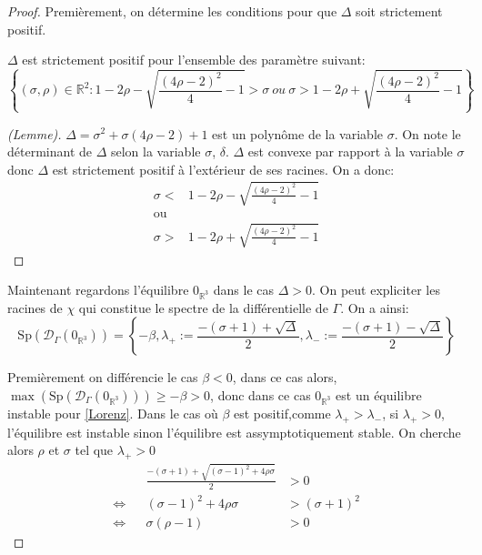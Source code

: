 \documentclass{article}
\newcommand{\R}{\mathbb{R}}
\newtheorem[M , nocut]{prop}{Proposition}[section]
\newtheorem[M , nocut]{definition}{Définition}
\newtheorem[M , nocut]{lemme}{Lemme}
\newtheorem[L , nocut]{thm}{Théoreme}
\newtheorem[M , nocut]{cor}{Corollaire}
\begin{document}
\begin{proof}
    Premièrement, on détermine les conditions pour que $\Delta$ soit strictement positif.
    \begin{lemme}
        $\Delta$ est strictement positif pour l'ensemble des paramètre suivant:
        \[
         \left\{(\sigma,\rho)\in \R ^2 : 1-2 \rho - \sqrt{\frac{(4\rho-2)^2}{4} -1 } > \sigma\ ou \ \sigma > 1-2 \rho + \sqrt{ \frac{(4\rho-2)^2}{4} -1  } \right\}    
        \]
    \end{lemme}
    
        \begin{proof}[(Lemme)]
            $\Delta = \sigma^2 + \sigma(4\rho-2) + 1$ est un polynôme de la variable $\sigma$. On note le déterminant de $\Delta$ selon la variable $\sigma$, $\delta$. $\Delta$ est convexe par rapport à la variable $\sigma$ donc $\Delta$ est strictement positif à l'extérieur de ses racines. On a donc:
            \begin{align*}
                \sigma <& 1-2 \rho - \sqrt{\frac{(4\rho-2)^2}{4} -1 }\\
                \text{ou}\\
                \sigma >& 1-2 \rho + \sqrt{\frac{(4\rho-2)^2}{4} -1 }
            \end{align*}
        \end{proof}
        
    Maintenant regardons l'équilibre $0_{\R^3}$ dans le cas $\Delta> 0$. On peut expliciter les racines de $\chi$ qui constitue le spectre de la différentielle de $\Gamma$. On a ainsi:
    \[
        \mathrm{Sp}(\mathcal{D}_\Gamma (0_{\R^3}))= \left\{-\beta,\lambda_+ := \frac{-(\sigma+1) + \sqrt{\Delta}}{2},\lambda_- := \frac{-(\sigma+1) - \sqrt{\Delta}}{2}\right\}  
    \]

    Premièrement on différencie le cas $\beta<0$, dans ce cas alors, $\max(\mathrm{Sp}(\mathcal{D}_\Gamma (0_{\R^3})))\ge -\beta > 0$, donc dans ce cas $0_{\R^3}$ est un équilibre instable pour \eqref{Lorenz}. Dans le cas où $\beta$ est positif,comme $\lambda_+>\lambda_-$, si $\lambda_+ > 0$, l'équilibre est instable sinon l'équilibre est assymptotiquement stable. On cherche alors $\rho$ et $\sigma$ tel que $\lambda_+>0$
    \begin{align*}
        && \frac{-(\sigma+1) + \sqrt{(\sigma-1)^2+4\rho\sigma}}{2} &>0 \\
        \Leftrightarrow && (\sigma-1)^2+4\rho\sigma &> (\sigma+1)^2 \\
        \Leftrightarrow && \sigma(\rho-1) &> 0
    \end{align*}
\end{proof}
\end{document}
